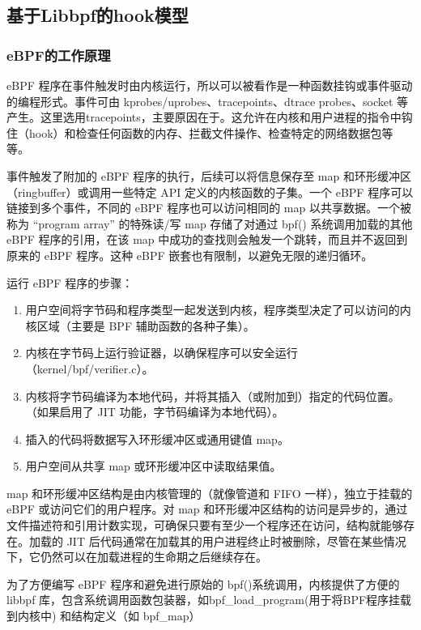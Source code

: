 \documentclass[12pt,a4paper]{ctexart}
\begin{document}
\subsection{基于Libbpf的hook模型}
\subsubsection{eBPF的工作原理}
eBPF 程序在事件触发时由内核运行，所以可以被看作是一种函数挂钩或事件驱动的编程形式。事件可由 kprobes/uprobes、tracepoints、dtrace probes、socket 等产生。这里选用tracepoints，主要原因在于。这允许在内核和用户进程的指令中钩住（hook）和检查任何函数的内存、拦截文件操作、检查特定的网络数据包等等。


事件触发了附加的 eBPF 程序的执行，后续可以将信息保存至 map 和环形缓冲区（ringbuffer）或调用一些特定 API 定义的内核函数的子集。一个 eBPF 程序可以链接到多个事件，不同的 eBPF 程序也可以访问相同的 map 以共享数据。一个被称为 “program array” 的特殊读/写 map 存储了对通过 bpf() 系统调用加载的其他 eBPF 程序的引用，在该 map 中成功的查找则会触发一个跳转，而且并不返回到原来的 eBPF 程序。这种 eBPF 嵌套也有限制，以避免无限的递归循环。


运行 eBPF 程序的步骤：
\begin{enumerate}
  \item 用户空间将字节码和程序类型一起发送到内核，程序类型决定了可以访问的内核区域（主要是 BPF 辅助函数的各种子集）。
  \item 内核在字节码上运行验证器，以确保程序可以安全运行（kernel/bpf/verifier.c）。
  \item 内核将字节码编译为本地代码，并将其插入（或附加到）指定的代码位置。（如果启用了 JIT 功能，字节码编译为本地代码）。
  \item 插入的代码将数据写入环形缓冲区或通用键值 map。
  \item 用户空间从共享 map 或环形缓冲区中读取结果值。
\end{enumerate}\par
map 和环形缓冲区结构是由内核管理的（就像管道和 FIFO 一样），独立于挂载的 eBPF 或访问它们的用户程序。对 map 和环形缓冲区结构的访问是异步的，通过文件描述符和引用计数实现，可确保只要有至少一个程序还在访问，结构就能够存在。加载的 JIT 后代码通常在加载其的用户进程终止时被删除，尽管在某些情况下，它仍然可以在加载进程的生命期之后继续存在。


为了方便编写 eBPF 程序和避免进行原始的 bpf()系统调用，内核提供了方便的 libbpf 库，包含系统调用函数包装器，如bpf\_load\_program(用于将BPF程序挂载到内核中) 和结构定义（如 bpf\_map）
\end{document}
